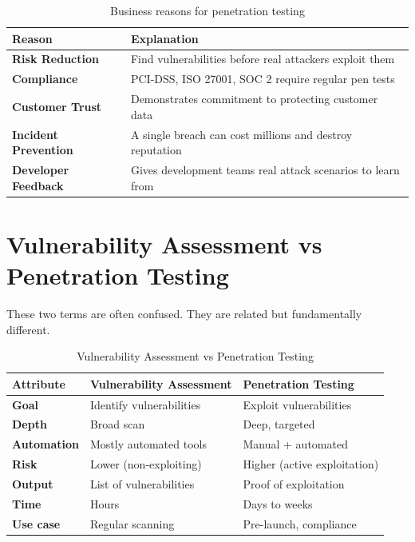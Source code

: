 \begin{table}[H]
\centering
\caption{Business reasons for penetration testing}
\begin{tabularx}{\textwidth}{>{\bfseries}lX}
\toprule
Reason & Explanation \\
\midrule
Risk Reduction & Find vulnerabilities before real attackers exploit them \\
Compliance & PCI-DSS, ISO 27001, SOC 2 require regular pen tests \\
Customer Trust & Demonstrates commitment to protecting customer data \\
Incident Prevention & A single breach can cost millions and destroy reputation \\
Developer Feedback & Gives development teams real attack scenarios to learn from \\
\bottomrule
\end{tabularx}
\end{table}

\section{Vulnerability Assessment vs Penetration Testing}

These two terms are often confused. They are related but fundamentally different.

\begin{table}[H]
\centering
\caption{Vulnerability Assessment vs Penetration Testing}
\begin{tabularx}{\textwidth}{>{\bfseries}lXX}
\toprule
Attribute & Vulnerability Assessment & Penetration Testing \\
\midrule
Goal & Identify vulnerabilities & Exploit vulnerabilities \\
Depth & Broad scan & Deep, targeted \\
Automation & Mostly automated tools & Manual + automated \\
Risk & Lower (non-exploiting) & Higher (active exploitation) \\
Output & List of vulnerabilities & Proof of exploitation \\
Time & Hours & Days to weeks \\
Use case & Regular scanning & Pre-launch, compliance \\
\bottomrule
\end{tabularx}
\end{table}


